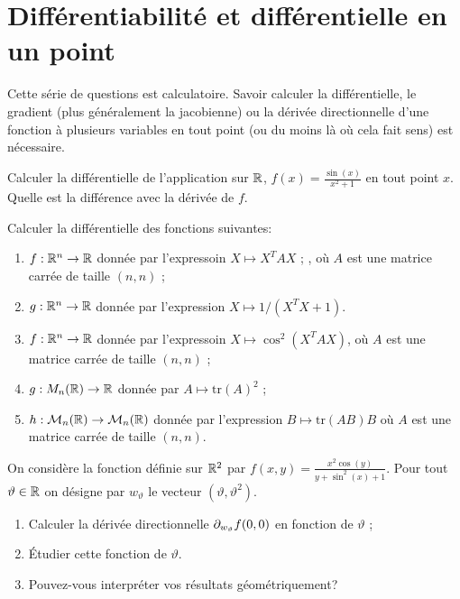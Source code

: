\documentclass[11pt, a4paper]{article}
\begin{document}
\section{Différentiabilité et différentielle en un point}
\label{sec:diffetdiff}

Cette série de questions est calculatoire. Savoir calculer la
différentielle, le gradient (plus généralement la jacobienne) ou la
dérivée directionnelle d'une fonction à plusieurs variables en tout
point (ou du moins là où cela fait sens) est nécessaire.

\begin{question}
  Calculer la différentielle de l'application sur $\mathbb{R}$,
  $f(x) = \frac{\sin(x)}{x^2+1}$ en tout point $x$. Quelle est la
  différence avec la dérivée de $f$.
\end{question}

\begin{question}
  Calculer la différentielle des fonctions suivantes:
  \begin{enumerate}
  \item $f :\mathbb{R}^n \rightarrow \mathbb{R}$ donnée par l'expressoin
    $X \mapsto X^TAX$ ; , où $A$ est une matrice carrée de taille
    $(n, n)$ ;
  \item $g : \mathbb{R}^n \rightarrow \mathbb{R}$ donnée par l'expression
    $X \mapsto 1/(X^TX + 1)$.
  \item $f : \mathbb{R}^n \rightarrow \mathbb{R}$ donnée par l'expressoin
    $X \mapsto \cos^2(X^TAX)$, où $A$ est une matrice carrée de taille
    $(n, n)$ ;
  \item $g : M_n(\mathbb{R}) \rightarrow \mathbb{R}$ donnée par
    $A \mapsto \mathrm{tr}(A)^2$ ;
  \item $h : \mathcal{M}_n(\mathbb{R}) \rightarrow \mathcal{M}_n(\mathbb{R})$ donnée par
    l'expression $B \mapsto \mathrm{tr}(AB)B$ où $A$ est une matrice
    carrée de taille $(n, n)$.
  \end{enumerate}
\end{question}

\begin{question}
  On considère la fonction définie sur $\mathbb{R}^2$ par
  $f(x, y) = \frac{x^2\cos(y)}{y + \sin^2(x) + 1}$. Pour tout
  $\vartheta \in \mathbb{R}$ on désigne par $w_\vartheta$ le vecteur
  $(\vartheta, \vartheta^2)$.
  \begin{enumerate}
  \item Calculer la dérivée directionnelle $\partial_{w_\vartheta}f(0, 0)$
    en fonction de $\vartheta$ ;
  \item Étudier cette fonction de $\vartheta$.
  \item Pouvez-vous interpréter vos résultats géométriquement?
  \end{enumerate}
\end{question}
\end{document}
